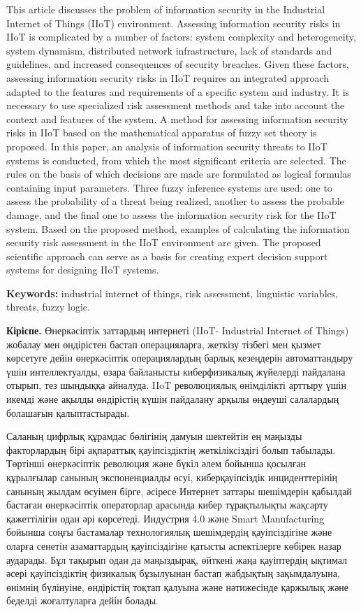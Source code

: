 This article discusses the problem of information security in the
Industrial Internet of Things (IIoT) environment. Assessing information
security risks in IIoT is complicated by a number of factors: system
complexity and heterogeneity, system dynamism, distributed network
infrastructure, lack of standards and guidelines, and increased
consequences of security breaches. Given these factors, assessing
information security risks in IIoT requires an integrated approach
adapted to the features and requirements of a specific system and
industry. It is necessary to use specialized risk assessment methods and
take into account the context and features of the system. A method for
assessing information security risks in IIoT based on the mathematical
apparatus of fuzzy set theory is proposed. In this paper, an analysis of
information security threats to IIoT systems is conducted, from which
the most significant criteria are selected. The rules on the basis of
which decisions are made are formulated as logical formulas containing
input parameters. Three fuzzy inference systems are used: one to assess
the probability of a threat being realized, another to assess the
probable damage, and the final one to assess the information security
risk for the IIoT system. Based on the proposed method, examples of
calculating the information security risk assessment in the IIoT
environment are given. The proposed scientific approach can serve as a
basis for creating expert decision support systems for designing IIoT
systems.

{\bfseries Keywords:} industrial internet of things, risk assessment,
linguistic variables, threats, fuzzy logic.

{\bfseries Кіріспе.} Өнеркәсіптік заттардың интернеті (IIoT- Industrial
Internet of Things) жобалау мен өндірістен бастап операцияларға, жеткізу
тізбегі мен қызмет көрсетуге дейін өнеркәсіптік операциялардың барлық
кезеңдерін автоматтандыру үшін интеллектуалды, өзара байланысты
киберфизикалық жүйелерді пайдалана отырып, тез шындыққа айналуда. IIoT
революциялық өнімділікті арттыру үшін икемді және ақылды өндірістің
күшін пайдалану арқылы өңдеуші салалардың болашағын қалыптастырады.

Саланың цифрлық құрамдас бөлігінің дамуын шектейтін ең маңызды
факторлардың бірі ақпараттық қауіпсіздіктің жеткіліксіздігі болып
табылады. Төртінші өнеркәсіптік революция және бүкіл әлем бойынша
қосылған құрылғылар санының экспоненциалды өсуі, киберқауіпсіздік
инциденттерінің санының жылдам өсуімен бірге, әсіресе Интернет заттары
шешімдерін қабылдай бастаған өнеркәсіптік операторлар арасында кибер
тұрақтылықты жақсарту қажеттілігін одан әрі көрсетеді. Индустрия 4.0
және Smart Manufacturing бойынша соңғы бастамалар технологиялық
шешімдердің қауіпсіздігіне және оларға сенетін азаматтардың
қауіпсіздігіне қатысты аспектілерге көбірек назар аударады. Бұл тақырып
одан да маңыздырақ, өйткені жаңа қауіптердің ықтимал әсері
қауіпсіздіктің физикалық бұзылуынан бастап жабдықтың зақымдалуына,
өнімнің бүлінуіне, өндірістің тоқтап қалуына және нәтижесінде қаржылық
және беделді жоғалтуларға дейін болады.

